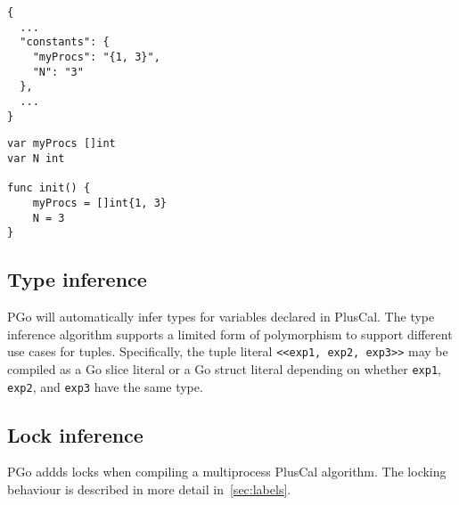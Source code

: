 \noindent\begin{minipage}{0.45\textwidth}
\begin{lstlisting}
{
  ...
  "constants": {
    "myProcs": "{1, 3}",
    "N": "3"
  },
  ...
}
\end{lstlisting}
\end{minipage}
\hfill\begin{minipage}{0.45\textwidth}
\begin{lstlisting}[language=golang]
var myProcs []int
var N int

func init() {
	myProcs = []int{1, 3}
	N = 3
}
\end{lstlisting}
\end{minipage}

\subsection{Type inference}
PGo will automatically infer types for variables declared in PlusCal. The type inference algorithm supports a limited form of polymorphism to support different use cases for tuples. Specifically, the tuple literal \lstinline[language=pcal]|<<exp1, exp2, exp3>>| may be compiled as a Go slice literal or a Go struct literal depending on whether \lstinline[language=pcal]|exp1|, \lstinline[language=pcal]|exp2|, and \lstinline[language=pcal]|exp3| have the same type.

\subsection{Lock inference}
PGo addds locks when compiling a multiprocess PlusCal algorithm. The locking behaviour is described in more detail in~\ref{sec:labels}.
